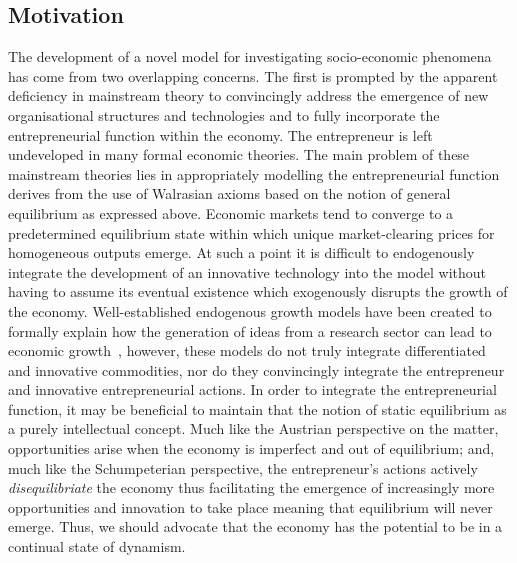 \subsection{Motivation}

The development of a novel model for investigating socio-economic phenomena has come from two overlapping concerns. The first is prompted by the apparent deficiency in mainstream theory to convincingly address the emergence of new organisational structures and technologies and to fully incorporate the entrepreneurial function within the economy. The entrepreneur is left undeveloped in many formal economic theories. The main problem of these mainstream theories lies in appropriately modelling the entrepreneurial function derives from the use of Walrasian axioms based on the notion of general equilibrium as expressed above. Economic markets tend to converge to a predetermined equilibrium state within which unique market-clearing prices for homogeneous outputs emerge. At such a point it is difficult to endogenously integrate the development of an innovative technology into the model without having to assume its eventual existence which exogenously disrupts the growth of the economy. Well-established endogenous growth models have been created to formally explain how the generation of ideas from a research sector can lead to economic growth~\citep{Romer1990}, however, these models do not truly integrate differentiated and innovative commodities, nor do they convincingly integrate the entrepreneur and innovative entrepreneurial actions. In order to integrate the entrepreneurial function, it may be beneficial to maintain that the notion of static equilibrium as a purely intellectual concept. Much like the Austrian perspective on the matter, opportunities arise when the economy is imperfect and out of equilibrium; and, much like the Schumpeterian perspective, the entrepreneur's actions actively \emph{disequilibriate} the economy thus facilitating the emergence of increasingly more opportunities and innovation to take place meaning that equilibrium will never emerge. Thus, we should advocate that the economy has the potential to be in a continual state of dynamism.

